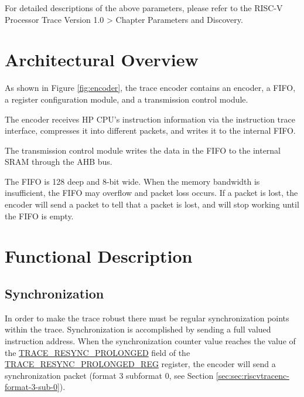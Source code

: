 \documentclass[main\_\_EN.tex]{subfiles}
\begin{document}
For detailed descriptions of the above parameters, please refer to the RISC-V Processor Trace Version 1.0 > Chapter Parameters and Discovery.



\section{Architectural Overview}
\label{sec:riscvtracenc-arch-overview}


As shown in Figure \ref{fig:encoder}, the trace encoder contains an encoder, a FIFO, a register configuration module, and a transmission control module.

The encoder receives HP CPU's instruction information via the instruction trace interface, compresses it into different packets, and writes it to the internal FIFO.

The transmission control module writes the data in the FIFO to the internal SRAM through the AHB bus.

The FIFO is 128 deep and 8-bit wide. When the memory bandwidth is insufficient, the FIFO may overflow and packet loss occurs. If a packet is lost, the encoder will send a packet to tell that a packet is lost, and will stop working until the FIFO is empty.



\section{Functional Description}
\label{sec:riscvtracenc-func-desc}

\subsection{Synchronization}

In order to make the trace robust there must be regular synchronization points within the trace. Synchronization is accomplished by sending a full valued instruction address. When the synchronization counter value reaches the value of the \hyperref[fielddesc:TRACERESYNCPROLONGED]{TRACE\_RESYNC\_PROLONGED} field of the \hyperref[regdesc:TRACERESYNCPROLONGEDREG]{TRACE\_RESYNC\_PROLONGED\_REG} register, the encoder will send a synchronization packet (format 3 subformat 0, see Section \ref{sec:sec:riscvtracenc-format-3-sub-0}).
\end{document}
